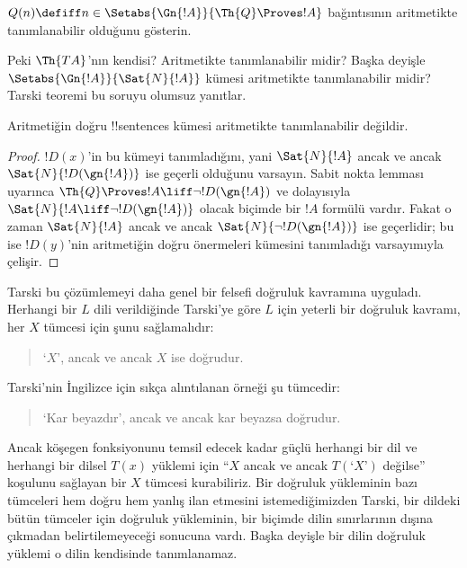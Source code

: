 \begin{prob}
$Q(n) \defiff n \in \Setabs{\Gn{!A}}{\Th{Q} \Proves !A}$ bağıntısının
aritmetikte tanımlanabilir olduğunu gösterin.
\end{prob}

Peki $\Th{TA}$'nın kendisi? Aritmetikte tanımlanabilir midir? Başka deyişle
$\Setabs{\Gn{!A}}{\Sat{N}{!A}}$ kümesi aritmetikte tanımlanabilir midir?
Tarski teoremi bu soruyu olumsuz yanıtlar.

\begin{thm}
Aritmetiğin doğru !!{sentence}s kümesi aritmetikte tanımlanabilir değildir.
\end{thm}

\begin{proof} 
$!D(x)$'in bu kümeyi tanımladığını, yani $\Sat{N}{!A}$ ancak ve ancak
$\Sat{N}{!D(\gn{!A})}$ ise geçerli olduğunu varsayın. Sabit nokta lemması
uyarınca $\Th{Q} \Proves !A \liff \lnot !D(\gn{!A})$ ve dolayısıyla
$\Sat{N}{!A \liff \lnot !D(\gn{!A})}$ olacak biçimde bir $!A$ formülü vardır.
Fakat o zaman $\Sat{N}{!A}$ ancak ve ancak
$\Sat{N}{\lnot !D(\gn{!A})}$ ise geçerlidir; bu ise $!D(y)$'nin aritmetiğin
doğru önermeleri kümesini tanımladığı varsayımıyla çelişir.
\end{proof}

Tarski bu çözümlemeyi daha genel bir felsefi doğruluk kavramına uyguladı.
Herhangi bir $L$ dili verildiğinde Tarski'ye göre $L$ için yeterli bir doğruluk kavramı, her
$X$ tümcesi için şunu sağlamalıdır:
\begin{quote}
`$X$', ancak ve ancak $X$ ise doğrudur.
\end{quote}
Tarski'nin İngilizce için sıkça alıntılanan örneği şu tümcedir:
\begin{quote}
`Kar beyazdır', ancak ve ancak kar beyazsa doğrudur.
\end{quote}
Ancak köşegen fonksiyonunu temsil edecek kadar güçlü herhangi bir dil ve
herhangi bir dilsel $T(x)$ yüklemi için ``$X$ ancak ve ancak
$T(\text{`$X$'})$ değilse'' koşulunu sağlayan bir $X$ tümcesi kurabiliriz.
Bir doğruluk yükleminin bazı tümceleri hem doğru hem yanlış ilan etmesini
istemediğimizden Tarski, bir dildeki bütün tümceler için doğruluk yükleminin,
bir biçimde dilin sınırlarının dışına çıkmadan belirtilemeyeceği sonucuna
vardı. Başka deyişle bir dilin doğruluk yüklemi o dilin kendisinde
tanımlanamaz.

